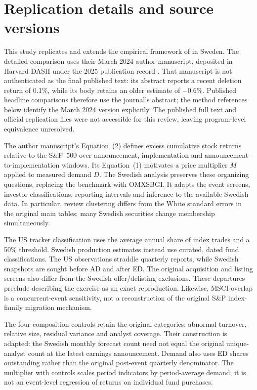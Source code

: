 \section{Replication details and source versions}
\label{app:replication}

This study replicates and extends the empirical framework of \citet{greenwood2025} in Sweden. The detailed comparison uses their March 2024 author manuscript, deposited in Harvard DASH under the 2025 publication record \citep{greenwood2024ms}. That manuscript is not authenticated as the final published text: its abstract reports a recent deletion return of 0.1\%, while its body retains an older estimate of $-0.6$\%. Published headline comparisons therefore use the journal's abstract; the method references below identify the March 2024 version explicitly. The published full text and official replication files were not accessible for this review, leaving program-level equivalence unresolved.

The author manuscript's Equation~(2) defines excess cumulative stock returns relative to the S\&P~500 over announcement, implementation and announcement-to-implementation windows. Its Equation~(1) motivates a price multiplier $M$ applied to measured demand $D$. The Swedish analysis preserves these organizing questions, replacing the benchmark with OMXSBGI. It adapts the event screens, investor classifications, reporting intervals and inference to the available Swedish data. In particular, review clustering differs from the White standard errors in the original main tables; many Swedish securities change membership simultaneously.



The US tracker classification uses the average annual share of index trades and a 50\% threshold. Swedish production estimates instead use curated, dated fund classifications. The US observations straddle quarterly reports, while Swedish snapshots are sought before AD and after ED. The original acquisition and listing screens also differ from the Swedish offer/delisting exclusions. These departures preclude describing the exercise as an exact reproduction. Likewise, MSCI overlap is a concurrent-event sensitivity, not a reconstruction of the original S\&P index-family migration mechanism.

The four composition controls retain the original categories: abnormal turnover, relative size, residual variance and analyst coverage. Their construction is adapted: the Swedish monthly forecast count need not equal the original unique-analyst count at the latest earnings announcement. Demand also uses ED shares outstanding rather than the original post-event quarterly denominator. The multiplier with controls scales period indicators by period-average demand; it is not an event-level regression of returns on individual fund purchases.

